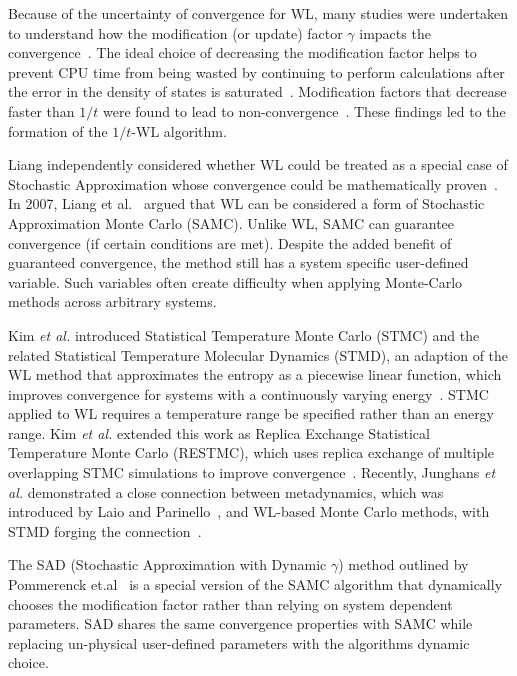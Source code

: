 \documentclass[letterpaper,twocolumn,amsmath,amssymb,pre,aps,10pt]{revtex4-1}
\begin{document}
Because of the uncertainty of convergence for WL, many studies were undertaken
to understand how the modification (or update) factor $\gamma$ impacts the
convergence~\cite{zhou2005understanding,lee2006convergence,
belardinelli2007wang}. The ideal choice of decreasing the modification factor
helps to prevent CPU time from being wasted by continuing to perform
calculations after the error in the density of states is
saturated~\cite{belardinelli2008analysis}. Modification factors that decrease
faster than $1/t$ were found to lead to
non-convergence~\cite{belardinelli2007fast}.  These findings led to the
formation of the $1/t$-WL algorithm.

Liang independently considered whether WL could be treated as a special case of
Stochastic Approximation whose convergence could be mathematically
proven~\cite{liang2006theory, liang2007stochastic}. In 2007, Liang et
al.~\cite{liang2007stochastic} argued that WL can be considered a form of
Stochastic Approximation Monte Carlo (SAMC). Unlike WL, SAMC can guarantee
convergence (if certain conditions are met). Despite the added benefit of
guaranteed convergence, the method still has a system specific user-defined
variable. Such variables often create difficulty when applying Monte-Carlo
methods across arbitrary systems.

Kim \emph{et al.} introduced Statistical Temperature Monte Carlo (STMC) and the
related Statistical Temperature Molecular Dynamics (STMD), an adaption
of the WL method that approximates the entropy as a piecewise linear function,
which improves convergence for systems with a continuously varying
energy~\cite{kim2006statistical, kim2007statistical}. STMC applied to WL
requires a temperature range be specified rather than an energy range.  Kim
\emph{et al.} extended this work as Replica Exchange Statistical Temperature
Monte Carlo (RESTMC), which uses replica exchange of multiple overlapping STMC
simulations to improve convergence~\cite{kim2009replica}. Recently,
Junghans \emph{et al.} demonstrated a close connection between
metadynamics, which was introduced by Laio and
Parinello~\cite{laio2002escaping}, and WL-based Monte Carlo methods, with STMD
forging the connection~\cite{junghans2014molecular}.

The SAD (Stochastic Approximation with
Dynamic $\gamma$) method outlined by Pommerenck
et.al~\cite{pommerenck2020stochastic} is a special version of the SAMC algorithm
that dynamically chooses the modification factor rather than relying on system
dependent parameters. SAD shares the same convergence properties with SAMC while
replacing un-physical user-defined parameters with the algorithms dynamic
choice.
\end{document}
